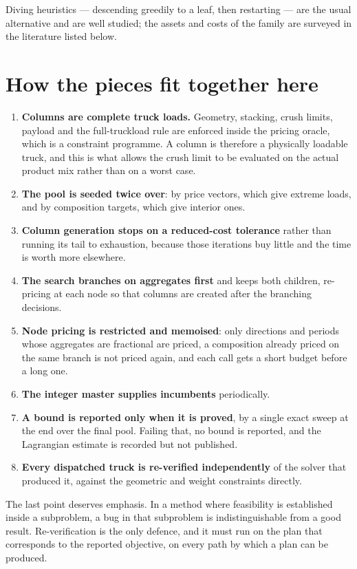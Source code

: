\documentclass[11pt,a4paper]{article}
\begin{document}
Diving heuristics --- descending greedily to a leaf, then restarting --- are the
usual alternative and are well studied; the assets and costs of the family are
surveyed in the literature listed below.

\section{How the pieces fit together here}

\begin{enumerate}[leftmargin=1.6em]
\item \textbf{Columns are complete truck loads.} Geometry, stacking, crush
limits, payload and the full-truckload rule are enforced inside the pricing
oracle, which is a constraint programme. A column is therefore a physically
loadable truck, and this is what allows the crush limit to be evaluated on the
actual product mix rather than on a worst case.
\item \textbf{The pool is seeded twice over}: by price vectors, which give
extreme loads, and by composition targets, which give interior ones.
\item \textbf{Column generation stops on a reduced-cost tolerance} rather than
running its tail to exhaustion, because those iterations buy little and the time
is worth more elsewhere.
\item \textbf{The search branches on aggregates first} and keeps both children,
re-pricing at each node so that columns are created after the branching
decisions.
\item \textbf{Node pricing is restricted and memoised}: only directions and
periods whose aggregates are fractional are priced, a composition already priced
on the same branch is not priced again, and each call gets a short budget before
a long one.
\item \textbf{The integer master supplies incumbents} periodically.
\item \textbf{A bound is reported only when it is proved}, by a single exact
sweep at the end over the final pool. Failing that, no bound is reported, and
the Lagrangian estimate is recorded but not published.
\item \textbf{Every dispatched truck is re-verified independently} of the solver
that produced it, against the geometric and weight constraints directly.
\end{enumerate}

The last point deserves emphasis. In a method where feasibility is established
inside a subproblem, a bug in that subproblem is indistinguishable from a good
result. Re-verification is the only defence, and it must run on the plan that
corresponds to the reported objective, on every path by which a plan can be
produced.
\end{document}
